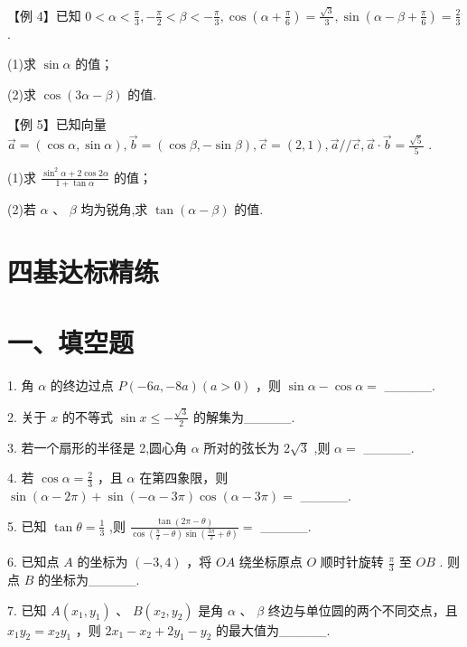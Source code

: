 【例 4】已知 $0 < \alpha  < \frac{\pi }{3}, - \frac{\pi }{2} < \beta  <  - \frac{\pi }{3},\cos \left( {\alpha  + \frac{\pi }{6}}\right)  = \frac{\sqrt{3}}{3},\sin \left( {\alpha  - \beta  + \frac{\pi }{6}}\right)  = \frac{2}{3}$ .

(1)求 $\sin \alpha$ 的值；

(2)求 $\cos \left( {{3\alpha } - \beta }\right)$ 的值.

【例 5】已知向量 $\overrightarrow{a} = \left( {\cos \alpha ,\sin \alpha }\right) ,\overrightarrow{b} = \left( {\cos \beta , - \sin \beta }\right) ,\overrightarrow{c} = \left( {2,1}\right) ,\overrightarrow{a}//\overrightarrow{c},\overrightarrow{a} \cdot  \overrightarrow{b} = \frac{\sqrt{5}}{5}$ .

(1)求 $\frac{{\sin }^{2}\alpha  + 2\cos {2\alpha }}{1 + \tan \alpha }$ 的值；

(2)若 $\alpha$ 、 $\beta$ 均为锐角,求 $\tan \left( {\alpha  - \beta }\right)$ 的值.

\section*{四基达标精练}

\section*{一、填空题}

1. 角 $\alpha$ 的终边过点 $P\left( {-{6a}, - {8a}}\right) \left( {a > 0}\right)$ ，则 $\sin \alpha  - \cos \alpha  =$ \_\_\_\_\_.

2. 关于 $x$ 的不等式 $\sin x \leq   - \frac{\sqrt{3}}{2}$ 的解集为\_\_\_\_\_.

3. 若一个扇形的半径是 2,圆心角 $\alpha$ 所对的弦长为 $2\sqrt{3}$ ,则 $\alpha  =$ \_\_\_\_\_.

4. 若 $\cos \alpha  = \frac{2}{3}$ ，且 $\alpha$ 在第四象限，则 $\sin \left( {\alpha  - {2\pi }}\right)  + \sin \left( {-\alpha  - {3\pi }}\right) \cos \left( {\alpha  - {3\pi }}\right)  =$ \_\_\_\_\_.

5. 已知 $\tan \theta  = \frac{1}{3}$ ,则 $\frac{\tan \left( {{2\pi } - \theta }\right) }{\cos \left( {\frac{\pi }{2} - \theta }\right) \sin \left( {\frac{3\pi }{2} + \theta }\right) } =$ \_\_\_\_\_.

6. 已知点 $A$ 的坐标为 $\left( {-3,4}\right)$ ，将 ${OA}$ 绕坐标原点 $O$ 顺时针旋转 $\frac{\pi }{3}$ 至 ${OB}$ . 则点 $B$ 的坐标为\_\_\_\_\_.

7. 已知 $A\left( {{x}_{1},{y}_{1}}\right)$ 、 $B\left( {{x}_{2},{y}_{2}}\right)$ 是角 $\alpha$ 、 $\beta$ 终边与单位圆的两个不同交点，且 ${x}_{1}{y}_{2} = {x}_{2}{y}_{1}$ ，则 $2{x}_{1} - {x}_{2} +  2{y}_{1} - {y}_{2}$ 的最大值为\_\_\_\_\_.

